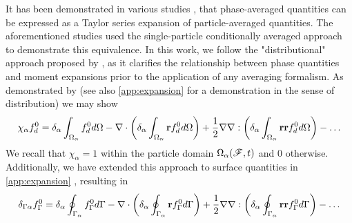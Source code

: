 It has been demonstrated in various studies \citep{buyevich1979flow,lhuillier1992ensemble,zhang1994averaged}, that phase-averaged quantities can be expressed as a Taylor series expansion of particle-averaged quantities. 
The aforementioned studies used the single-particle conditionally averaged approach to demonstrate this equivalence.  
In this work, we follow the "distributional" approach proposed by \citet{pahtz2023general}, as it clarifies the relationship between phase quantities and moment expansions prior to the application of any averaging formalism.
As demonstrated by \citet{pahtz2023general} (see also \ref{app:expansion} for a demonstration in the sense of distribution) we may show
\begin{equation}
    \chi_\alpha f^0_d 
    =\delta_\alpha\intO{f^0_d}
    - \div\left(\delta_\alpha\intO{\textbf{r} f^0_d}\right)
    + \frac{1}{2}\grad\grad :\left(\delta_\alpha\intO{\textbf{rr} f^0_d}\right)-
    \ldots 
    \label{eq:fd_asympt0}
\end{equation}
We recall that $\chi_\alpha = 1$ within the particle domain $\Omega_\alpha(\mathscr{F}, t)$ and $0$ otherwise. 
Additionally, we have extended this approach to surface quantities in \ref{app:expansion} , resulting in
\begin{equation}
    \delta_{\Gamma\alpha}f_\Gamma^0  
=\delta_\alpha\intS{f^0_\Gamma}
- \div\left(\delta_\alpha\intS{\textbf{r} f^0_\Gamma}\right)
+ \frac{1}{2}\grad\grad :\left(\delta_\alpha\intS{\textbf{rr} f^0_\Gamma}\right)-
\ldots 
\label{eq:fG_asympt0}
\end{equation}
